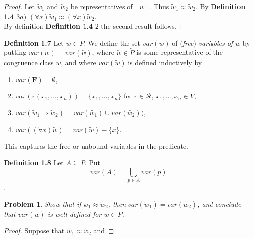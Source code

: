 \documentclass{article}
\theoremstyle{problemstyle}
\newtheorem{problem}{Problem}
\theoremstyle{lemmastyle}
\theoremstyle{theoremstyle}
\theoremstyle{problemstyle}
\begin{document}
\begin{proof}
Let $\widetilde{w}_1$ and $\widetilde{w}_2$ be representatives of $[w]$. Thus $\widetilde{w}_1 \approx \widetilde{w}_2$. By \textbf{Definition 1.4} $3a)$ $(\forall x)\widetilde{w}_1 \approx (\forall x)\widetilde{w}_2$.\\

By definition  \textbf{Definition 1.4} $2$ the second result follows. 
\end{proof}

\textbf{Definition 1.7} Let $w \in P$. We define the set $var(w)$ of (\textit{free}) \textit{variables of $w$} by putting $var(w) = var(\widetilde{w})$, where $\widetilde{w} \in \widetilde{P}$ is some representative of the congruence class $w$, and where $var(\widetilde{w})$ is defined inductively by 
\begin{enumerate}
\item $var(\textbf{F}) = \emptyset$,
\item $var(r(x_1,...,x_n)) = \{x_1,...,x_n\}$ for $r \in \mathscr{R}$, $x_1,...,x_n \in V$,
\item $var(\widetilde{w}_1 \Rightarrow \widetilde{w}_2) = var(\widetilde{w_1})\cup var(\widetilde{w_2}))$,
\item $var((\forall x)\widetilde{w}) = var(\widetilde{w})-\{x\}$.
\end{enumerate}

This captures the free or unbound variables in the predicate. 

\textbf{Definition 1.8} Let $A \subseteq P$. Put $$var(A) = \bigcup_{p \in A}var(p)$$.

\begin{problem}
Show that if $\widetilde{w}_1 \approx \widetilde{w}_2$, then $var(\widetilde{w}_1) = var(\widetilde{w}_2)$, and conclude that $var(w)$ is well defined for $w \in P$. 
\end{problem}

\begin{proof}
Suppose that $\widetilde{w}_1 \approx \widetilde{w}_2$ and 
\end{proof}
\end{document}

